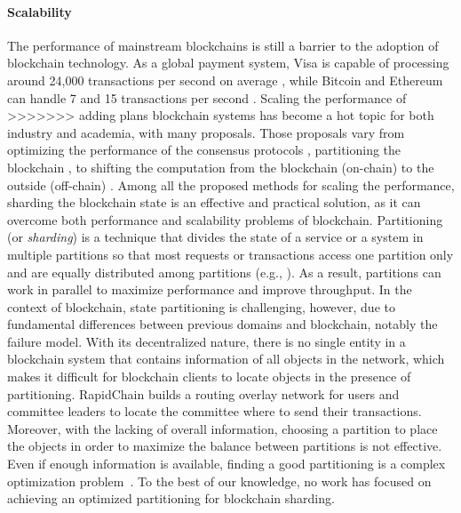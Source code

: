 \paragraph*{Scalability} The performance of mainstream blockchains is still a
barrier to the adoption of blockchain technology. As a global payment system,
Visa is capable of processing around 24,000 transactions per second on average
\cite{visa}, while Bitcoin and Ethereum can handle 7 and 15 transactions per
second \cite{ethereum:sharding, nakamoto2019bitcoin}. Scaling the performance of
>>>>>>> adding plans
blockchain systems has become a hot topic for both industry and academia, with
many proposals. Those proposals vary from optimizing the performance of the
consensus protocols \cite{dang2019towards}, partitioning the blockchain
\cite{wang2019sok}, to shifting the computation from the blockchain (on-chain)
to the outside (off-chain) \cite{teutsch2019scalable, network2018cheap}. Among
all the proposed methods for scaling the performance, sharding the blockchain state
is an effective and practical solution, as it can overcome both performance and
scalability problems of blockchain. Partitioning (or \emph{sharding}) is a
technique that divides the state of a service or a system in multiple partitions
so that most requests or transactions access one partition only and are equally
distributed among partitions (e.g., \cite{facebookTAO, sciascia2012sdur,
aguilera2007sinfonia}). As a result, partitions can work in parallel to maximize
performance and improve throughput. In the context of blockchain, state
partitioning is challenging, however, due to fundamental differences between
previous domains and blockchain, notably the failure model. With its
decentralized nature, there is no single entity in a blockchain system that
contains information of all objects in the network, which makes it difficult for
blockchain clients to locate objects in the presence of partitioning. RapidChain
\cite{zamani2018rapidchain} builds a routing overlay network for users and
committee leaders to locate the committee where to send their transactions.
Moreover, with the lacking of overall information, choosing a partition to place
the objects in order to maximize the balance between partitions is not
effective. Even if enough information is available, finding a good partitioning
is a complex optimization problem~\cite{curino2010sch,taft2014est}. To the best
of our knowledge, no work has focused on achieving an optimized partitioning for
blockchain sharding.

